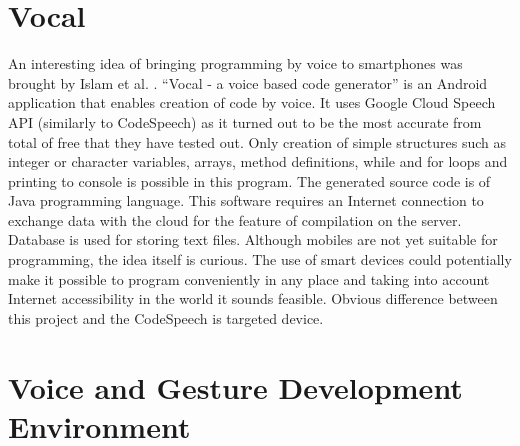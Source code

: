 \section{Vocal}
An interesting idea of bringing programming by voice to smartphones was brought by Islam et al. \cite{Islam2018}. ``Vocal - a voice based code generator'' is an Android application that enables creation of code by voice. It uses Google Cloud Speech API (similarly to CodeSpeech) as it turned out to be the most accurate from total of free that they have tested out. Only creation of simple structures such as integer or character variables, arrays, method definitions, while and for loops and printing to console is possible in this program. The generated source code is of Java programming language. This software requires an Internet connection to exchange data with the cloud for the feature of compilation on the server. Database is used for storing text files. Although mobiles are not yet suitable for programming, the idea itself is curious. The use of smart devices could potentially make it possible to program conveniently in any place and taking into account Internet accessibility in the world it sounds feasible. Obvious difference between this project and the CodeSpeech is targeted device.

\section{Voice and Gesture Development Environment}

